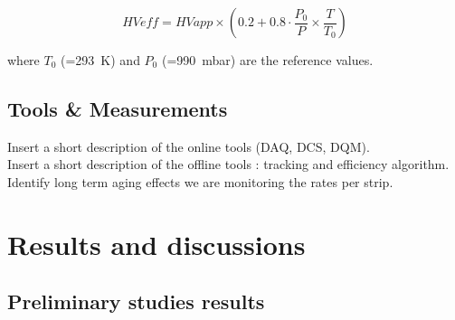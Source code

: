\begin{equation}
	HVeff = HVapp\times\left(0.2 + 0.8\cdot\frac{P_0}{P}\times\frac{T}{T_0}\right)
\end{equation}

where $T_0$ (=\SI{293}{K}) and $P_0$ (=\SI{990}{mbar}) are the reference values.

	\subsection{Tools \& Measurements}

	Insert a short description of the online tools (DAQ, DCS, DQM).\\
	Insert a short description of the offline tools : tracking and efficiency algorithm.\\
	Identify long term aging effects we are monitoring the rates per strip.

\section{Results and discussions}
\label{sec:results6}

	\subsection{Preliminary studies results}
	\label{ssec:GIFResults}
	
